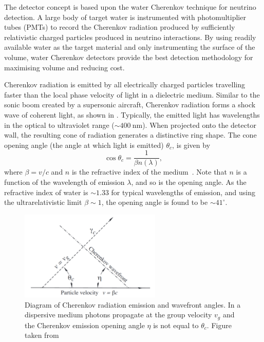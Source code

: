 The \chips detector concept is based upon the water Cherenkov technique for neutrino detection. A
large body of target water is instrumented with photomultiplier tubes (PMTs) to record the
Cherenkov radiation produced by sufficiently relativistic charged particles produced in neutrino
interactions. By using readily available water as the target material and only instrumenting the
surface of the volume, water Cherenkov detectors provide the best detection methodology for
maximising volume and reducing cost.

Cherenkov radiation is emitted by all electrically charged particles travelling faster than the
local phase velocity of light in a dielectric medium. Similar to the sonic boom created by a
supersonic aircraft, Cherenkov radiation forms a shock wave of coherent light, as shown in
. Typically, the emitted light has wavelengths in the optical to
ultraviolet range ($\sim400~\text{nm}$). When projected onto the detector wall, the resulting cone
of radiation generates a distinctive ring shape. The cone opening angle (the angle at which light
is emitted) $\theta_{c}$, is given by
\begin{equation}
    \cos\theta_{c} = \frac{1}{\beta n(\lambda)},
    \label{eq:cherenkov_angle}
\end{equation}
where $\beta=v/c$ and $n$ is the refractive index of the medium~\cite{particle2020}. Note that $n$
is a function of the wavelength of emission $\lambda$, and so is the opening angle. As the
refractive index of water is $\sim 1.33$ for typical wavelengths of emission, and using the
ultrarelativistic limit $\beta\sim 1$, the opening angle is found to be $\sim41^{\circ}$.

\begin{figure} %
    \includegraphics[width=0.6\textwidth]{diagrams/4-chips/cherenkov.pdf}
    \caption[Diagram of Cherenkov radiation emission]
    {Diagram of Cherenkov radiation emission and wavefront angles. In a dispersive medium photons
        propagate at the group velocity $v_{g}$ and the Cherenkov emission opening angle $\eta$ is
        not equal to $\theta_{c}$. Figure taken from }
    \label{fig:cherenkov}
\end{figure}

